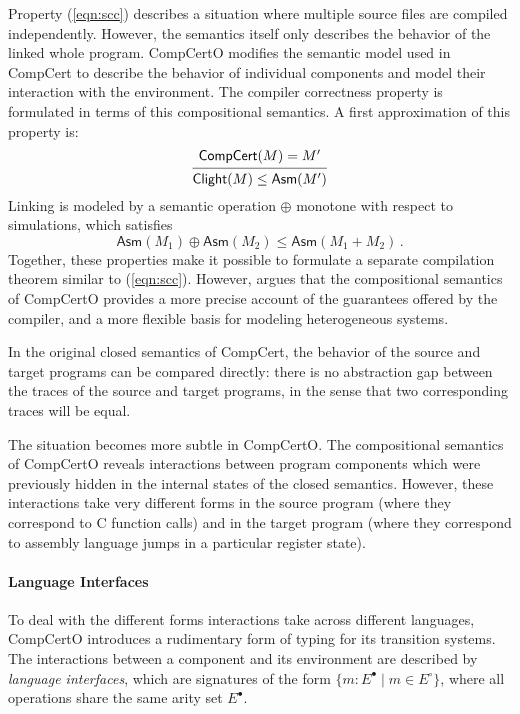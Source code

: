\documentclass[sigplan,10pt,review,anonymous]{acmart}
\newcommand{\kw}[1]{\ensuremath{ \mathsf{#1} }}
\newcommand{\que}{{\circ}}
\newcommand{\ans}{{\bullet}}
\begin{document}
Property (\ref{eqn:scc})
describes a situation where
multiple source files are compiled independently.
However,
the semantics itself
only describes the behavior of the linked whole program.
CompCertO modifies the semantic model used in CompCert
to describe the behavior of individual components
and model their interaction with the environment.
The compiler correctness property
is formulated in terms of this compositional semantics.
A first approximation of this property is:
\begin{equation} \label{eqn:ccc}
  \begin{prooftree}
    \hypo{\kw{CompCert}(M) = M'}
    \infer1{\kw{Clight}(M) \le \kw{Asm}(M')}
  \end{prooftree}
\end{equation}
Linking is modeled by a semantic operation $\oplus$
monotone with respect to simulations,
which satisfies
\[
  \kw{Asm}(M_1) \oplus \kw{Asm}(M_2) \le
  \kw{Asm}(M_1 + M_2)
  \,.
\]
Together,
these properties make it possible to formulate
a separate compilation theorem
similar to (\ref{eqn:scc}).
However,
\citet{compcerto} argues that
the compositional semantics of CompCertO
provides a more precise account 
of the guarantees offered by the compiler,
and a more flexible basis
for modeling heterogeneous systems.

In the original closed semantics of CompCert,
the behavior of the source and target programs
can be compared directly:
there is no abstraction gap between the traces
of the source and target programs,
in the sense that
two corresponding traces will be equal.

The situation becomes more subtle in CompCertO.
The compositional semantics of CompCertO
reveals interactions between program components
which were previously hidden in the internal states
of the closed semantics.
However,
these interactions take very different forms
in the source program
(where they correspond to C function calls)
and in the target program
(where they correspond to assembly language jumps
in a particular register state).


\paragraph{Language Interfaces} %

To deal with the different forms
interactions take
across different languages,
CompCertO introduces a rudimentary form of typing
for its transition systems.
The interactions between a component and its environment
are described by \emph{language interfaces},
which are signatures of the form
$\{ m : E^\ans \mid m \in E^\que \}$,
where all operations share the same arity set $E^\ans$.
\end{document}

